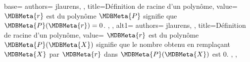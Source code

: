 {
  base={
    authors={
      jlaurens,
    },
    title=Définition de racine d'un polynôme,
    value={
\(\MDBMeta{r}\) est  du polynôme \(\MDBMeta{P}\) signifie que \(\MDBMeta{P}(\MDBMeta{r})=0\).
    },
  },
  alt1={
    authors={
      jlaurens,
    },
    title=Définition de racine d'un polynôme,
    value={
\(\MDBMeta{r}\) est  du polynôme \(\MDBMeta{P}(\MDBMeta{X})\) signifie que le nombre obtenu en remplaçant \(\MDBMeta{X}\) par \(\MDBMeta{r}\) dans \(\MDBMeta{P}(\MDBMeta{X})\) est \(0\).
    },
  },
}
